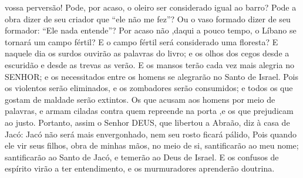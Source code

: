 { vossa perversão! Pode, por acaso, o oleiro ser considerado igual ao barro? Pode a obra dizer de seu criador que “ele não me fez”? Ou o vaso formado dizer de seu formador: “Ele nada entende”?
Por acaso não
{} ,daqui a pouco tempo, o Líbano se tornará um campo fértil? E o campo fértil será considerado uma floresta?
E naquele dia os surdos ouvirão as palavras do livro; e os olhos dos cegos desde a escuridão e desde as trevas as verão.
E os mansos terão cada vez mais alegria no SENHOR; e os necessitados entre os homens se alegrarão no Santo de Israel.
Pois os violentos serão eliminados, e os zombadores serão consumidos; e todos os que gostam de maldade serão extintos.
Os que acusam aos homens por meio de palavras, e armam ciladas contra quem
{} repreende na porta
{} ,e os que prejudicam ao justo.
Portanto, assim o Senhor DEUS, que libertou a Abraão, diz à casa de Jacó: Jacó não será mais envergonhado, nem seu rosto ficará pálido,
Pois quando ele vir seus filhos, obra de minhas mãos, no meio de si,
{} santificarão ao meu nome; santificarão ao Santo de Jacó, e temerão ao Deus de Israel.
E os confusos
 de espírito virão a ter entendimento, e os murmuradores aprenderão doutrina.

}
